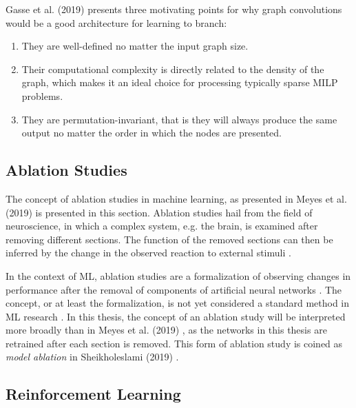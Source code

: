 Gasse et al. (2019) \cite{gasse2019exact} presents three motivating points for why graph convolutions would be a good architecture for learning to branch:
\begin{enumerate}[label=(\roman*)]
    \item They are well-defined no matter the input graph size.
    \item Their computational complexity is directly related
to the density of the graph, which makes it an ideal choice for processing typically sparse \gls{MILP}
problems.
    \item They are permutation-invariant, that is they will always produce the same output no
matter the order in which the nodes are presented.
\end{enumerate}






\subsection{Ablation Studies}

The concept of ablation studies in machine learning, as presented in 
Meyes et al. (2019) \cite{meyes2019ablation} is presented in this section.
Ablation studies hail from the field of neuroscience, in which a complex system, e.g. the brain, is examined after removing different sections. The function of the removed sections can then be inferred by the change in the observed reaction to external stimuli \cite{meyes2019ablation}.

In the context of \gls{ML}, ablation studies are a formalization of observing changes in performance after the removal of components of artificial neural networks \cite{meyes2019ablation}.  
The concept, or at least the formalization, is not yet considered a standard method in \gls{ML} research \cite{sheikholeslami2019ablation}.
In this thesis, the concept of an ablation study will be interpreted more broadly than in Meyes et al. (2019) \cite{meyes2019ablation}, as the networks in this thesis are retrained after each section is removed. This form of ablation study is coined as \textit{model ablation} in Sheikholeslami (2019) \cite{sheikholeslami2019ablation}.





\subsection{Reinforcement Learning}\label{ssec:back_rl}

